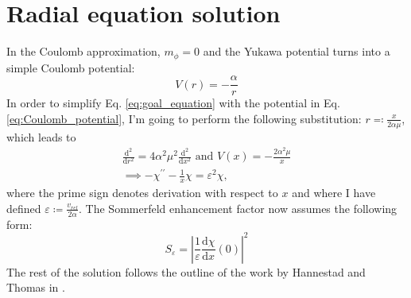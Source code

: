 \section{Radial equation solution}
In the Coulomb approximation, \(m_{\phi }=0 \) and the Yukawa potential turns into a simple Coulomb potential:
\begin{equation}\label{eq:Coulomb_potential}
	V(r)=-\frac{\alpha}{r}
\end{equation}
In order to simplify Eq. \eqref{eq:goal_equation} with the potential in Eq. \eqref{eq:Coulomb_potential}, I'm going to perform the following substitution: \(r \eqqcolon \frac{x}{2\alpha \mu } \), which leads to
\begin{gather}
	\frac{\mathrm{d}^2}{\mathrm{d}r^2} = 4 \alpha ^2 \mu ^2 \frac{\mathrm{d}^2}{\mathrm{d}x^2} \text{ and } V(x) = - \frac{2\alpha ^2\mu}{x} \\
	\implies - \chi^{\prime\prime} - \frac{1}{x} \chi = \varepsilon ^2 \chi, \label{eq:final_equation}
\end{gather}
where the prime sign denotes derivation with respect to \(x\) and where I have defined \(\varepsilon \coloneqq \frac{v_{rel} }{2 \alpha }\). The Sommerfeld enhancement factor now assumes the following form:
\begin{equation}
	S_{\varepsilon } = \left\vert \frac{1}{\varepsilon } \frac{\mathrm{d}\chi }{\mathrm{d}x} (0) \right\vert^2
\end{equation}
The rest of the solution follows the outline of the work by Hannestad and Thomas in \cite{Hannestad_2011}.

